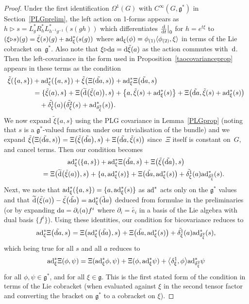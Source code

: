 \documentclass[pdftex]{sigma}
\numberwithin{equation}{section}
\newcommand{\<}{{\langle}}
\renewcommand{\>}{{\rangle}}
\renewcommand{\o}{{}_{\scriptstyle(1)}}
\renewcommand{\t}{{}_{\scriptstyle(2)}}
\newcommand{\extd}{{\rm d}}
\newcommand{\del}{{\partial}}
\newcommand{\la}{{\triangleright}}
\newcommand{\cg}{{\mathfrak{g}}}
\begin{document}
\begin{proof} Under the first identification $\Omega^1(G)$ with $C^\infty(G,\cg^*)$ in Section~\ref{PLGprelim}, the left action on 1-forms appears as $h\la s= L_g^*R_h^*L^*_{h^{-1}g^{-1}}(s(gh))$ which differentiates ${\extd \over\extd t}\big|_0$ for $h=e^{t\xi}$ to $(\xi\la s)(g)=\tilde\xi(s)(g)+ {\rm ad}_\xi^*(s(g))$ where ${\rm ad}_\xi(\phi)=\phi\o\<\phi\t,\xi\>$ in terms of the Lie cobracket on~$\cg^*$. Also note that $\xi\la\extd a=\extd\tilde\xi(a)$ as the action commutes with~$\extd$. Then the left-covariance in the form used in Proposition~\ref{taocovarianceprop} appears in these terms as the condition
\begin{align*} \tilde\xi(\{a,s\})&+{\rm ad}_\xi^*(\{a,s\})+ \tilde\xi\big(\Xi(\tilde{\extd a},s)\big) + {\rm ad}_\xi^*\Xi\big(\tilde{\extd a},s\big)\\
&=\{\tilde\xi(a),s\}+\Xi\big(\widetilde{\extd} \big(\tilde\xi(a)\big),s\big)+ \big\{a,\tilde\xi(s)+ {\rm ad}_\xi^*(s)\big\}+\Xi\big(\tilde{\extd a},\tilde\xi(s)+{\rm ad}_\xi^*(s)\big)\\
&\quad+\tilde{\delta^1_\xi}(a)\big(\tilde{\delta^2_\xi}(s)+{\rm ad}^*_{\delta^2_\xi}(s)\big).
\end{align*}
We now expand $\tilde\xi\{a,s\}$ using the PLG covariance in Lemma~\ref{PLGprop} (noting that $s$ is a $\cg^*$-valued function under our trivialisation of the bundle) and we expand $\tilde\xi\big(\Xi(\tilde{\extd a},s)\big)=\Xi\big(\tilde\xi\big(\tilde{\extd a}\big),s\big)+\Xi\big(\tilde{\extd a},\tilde\xi(s)\big)$ since~$\Xi$ itself is constant on~$G$, and cancel terms. Then our condition becomes
\begin{gather*}
{\rm ad}_\xi^*(\{a,s\})+ {\rm ad}_\xi^*\Xi\big(\tilde{\extd a},s\big)+ \Xi\big(\tilde\xi\big(\tilde{\extd a}\big),s\big)\\
\qquad{} =\Xi\big(\widetilde{\extd} \big(\tilde\xi(a)\big),s\big)+ \{a, {\rm ad}_\xi^*(s)\}+\Xi\big(\tilde{\extd a},{\rm ad}_\xi^*(s)\big)+\tilde{\delta^1_\xi}(a){\rm ad}^*_{\delta^2_\xi}(s).
\end{gather*}
Next, we note that ${\rm ad}_\xi^*(\{a,s\})= \{a, {\rm ad}_\xi^*(s)\}$ as ${\rm ad}^*$ acts only on the $\cg^*$ values and that $\widetilde{\extd} \big(\tilde\xi(a)\big)- \tilde\xi\big(\tilde{\extd a}\big)={\rm ad}_\xi^*\big(\tilde\extd a\big)$ deduced from formulae in the preliminaries (or by expanding $\extd a=\del_i(a)f^i$ where $\del_i=\tilde{e_i}$ in a basis of the Lie algebra with dual basis $\{f^i\}$). Using these identities, our condition for bicovariance reduces to
\[ {\rm ad}_\xi^*\Xi\big(\tilde{\extd a},s\big)=\Xi\big({\rm ad}_\xi^*\big(\tilde{\extd a}\big),s\big)+\Xi\big(\tilde{\extd a},{\rm ad}_\xi^*(s)\big)+\tilde{\delta^1_\xi}(a){\rm ad}^*_{\delta^2_\xi}(s),\]
which being true for all $s$ and all $a$ reduces to
\[ {\rm ad}_\xi^*\Xi(\phi,\psi)=\Xi({\rm ad}_\xi^*\phi,\psi)+\Xi(\phi,{\rm ad}_\xi^*\psi)+\big\langle\delta^1_\xi,\phi\big\rangle {\rm ad}^*_{\delta^2_\xi}\psi\]
for all $\phi,\psi\in\cg^*$, and for all $\xi\in\cg$. This is the first stated form of the condition in terms of the Lie cobracket (when evaluated against $\xi$ in the second tensor factor and converting the bracket on $\cg^*$ to a cobracket on $\xi$). \end{proof}
\end{document}
